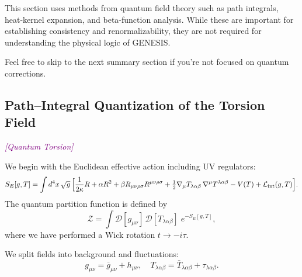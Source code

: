 \documentclass{article}
\newcommand{\quantumtag}{\textcolor{purple}{\textit{[Quantum Torsion]}}}
\begin{document}
\begin{tcolorbox}[
    colback=white,
    colframe=yellow!75!black,
    title=Note for non-specialists,
    boxrule=0.4pt,
    arc=2mm,
    fonttitle=\bfseries,
    coltitle=black,
    left=4pt, right=4pt, top=4pt, bottom=4pt
]
This section uses methods from quantum field theory such as path integrals, heat-kernel expansion, and beta-function analysis.  
While these are important for establishing consistency and renormalizability, they are not required for understanding the physical logic of GENESIS.

Feel free to skip to the next summary section if you're not focused on quantum corrections.
\end{tcolorbox}



\subsection{Path–Integral Quantization of the Torsion Field}
\label{sec:pi_quantization}
\quantumtag


We begin with the Euclidean effective action including UV regulators:
\begin{equation}
  S_E[g,T]
  = \int d^4x\,\sqrt{g}\,
  \Bigl[
    \frac{1}{2\kappa}R
    + \alpha R^2
    + \beta R_{\mu\nu\rho\sigma}R^{\mu\nu\rho\sigma}
    + \tfrac12 \nabla_\mu T_{\lambda\alpha\beta}\,\nabla^\mu T^{\lambda\alpha\beta}
    - V(T)
    + \mathcal{L}_{\rm int}(g,T)
  \Bigr].
\end{equation}
The quantum partition function is defined by
\begin{equation}
  \mathcal Z
  = \int \mathcal D[g_{\mu\nu}]\,\mathcal D[T_{\lambda\alpha\beta}]
    \;e^{-S_E[g,T]},
\end{equation}
where we have performed a Wick rotation \(t\to -i\tau\).

We split fields into background and fluctuations:
\begin{equation}\label{eq:auto77}
g_{\mu\nu} = \bar g_{\mu\nu} + h_{\mu\nu}, 
  \quad
  T_{\lambda\alpha\beta} = \bar T_{\lambda\alpha\beta} + \tau_{\lambda\alpha\beta}.
\end{equation}

\medskip
\begin{center}
\end{center}
\medskip
\end{document}
